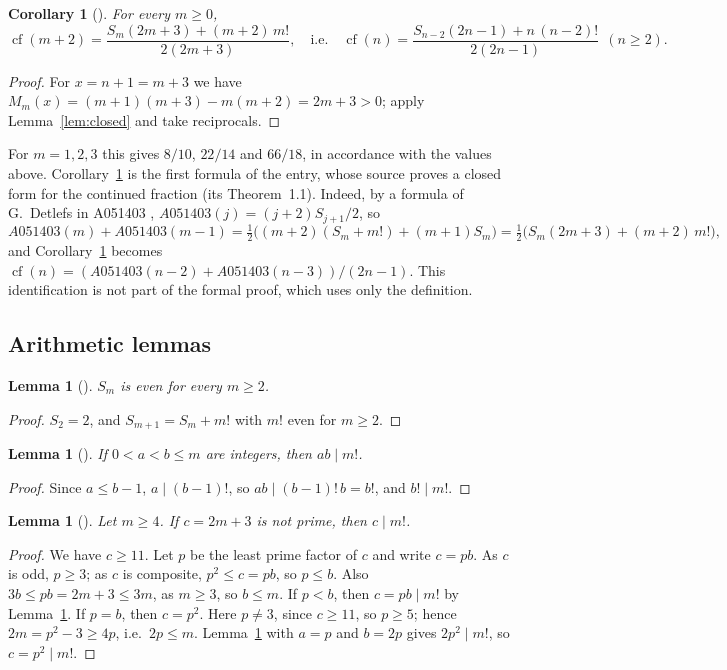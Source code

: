 \documentclass[11pt]{amsart}
\theoremstyle{plain}
\newtheorem{lemma}[theorem]{Lemma}
\newtheorem{corollary}[theorem]{Corollary}
\theoremstyle{definition}
\DeclareMathOperator{\cf}{cf}
\begin{document}
\begin{corollary}[]\label{cor:cf}
For every $m\ge0$,
\[
  \cf(m+2)=\frac{S_m(2m+3)+(m+2)\,m!}{2(2m+3)},\quad\text{i.e.}\quad \cf(n)=\frac{S_{n-2}(2n-1)+n\,(n-2)!}{2(2n-1)}\ \ (n\ge2).
\]
\end{corollary}

\begin{proof}
For $x=n+1=m+3$ we have $M_m(x)=(m+1)(m+3)-m(m+2)=2m+3>0$; apply Lemma~\ref{lem:closed} and take reciprocals.
\end{proof}

For $m=1,2,3$ this gives $8/10$, $22/14$ and $66/18$, in accordance with the values above.
Corollary~\ref{cor:cf} is the first formula of the entry, whose source \cite{Bz} proves a closed form for the continued fraction (its Theorem~1.1). Indeed, by a formula of G.~Detlefs in A051403 \cite{A051403}, $A051403(j)=(j+2)S_{j+1}/2$, so
\[
  A051403(m)+A051403(m-1)=\tfrac12\bigl((m+2)(S_m+m!)+(m+1)S_m\bigr)=\tfrac12\bigl(S_m(2m+3)+(m+2)\,m!\bigr),
\]
and Corollary~\ref{cor:cf} becomes $\cf(n)=(A051403(n-2)+A051403(n-3))/(2n-1)$. This identification is not part of the formal proof, which uses only the definition.

\subsection{Arithmetic lemmas}

\begin{lemma}[]\label{lem:even}
$S_m$ is even for every $m\ge2$.
\end{lemma}

\begin{proof}
$S_2=2$, and $S_{m+1}=S_m+m!$ with $m!$ even for $m\ge2$.
\end{proof}

\begin{lemma}[]\label{lem:ab}
If $0<a<b\le m$ are integers, then $ab\mid m!$.
\end{lemma}

\begin{proof}
Since $a\le b-1$, $a\mid(b-1)!$, so $ab\mid(b-1)!\,b=b!$, and $b!\mid m!$.
\end{proof}

\begin{lemma}[]\label{lem:comp}
Let $m\ge4$. If $c=2m+3$ is not prime, then $c\mid m!$.
\end{lemma}

\begin{proof}
We have $c\ge11$. Let $p$ be the least prime factor of $c$ and write $c=pb$. As $c$ is odd, $p\ge3$; as $c$ is composite, $p^2\le c=pb$, so $p\le b$. Also $3b\le pb=2m+3\le3m$, as $m\ge3$, so $b\le m$.
If $p<b$, then $c=pb\mid m!$ by Lemma~\ref{lem:ab}.
If $p=b$, then $c=p^2$. Here $p\ne3$, since $c\ge11$, so $p\ge5$; hence $2m=p^2-3\ge4p$, i.e.\ $2p\le m$. Lemma~\ref{lem:ab} with $a=p$ and $b=2p$ gives $2p^2\mid m!$, so $c=p^2\mid m!$.
\end{proof}
\end{document}
